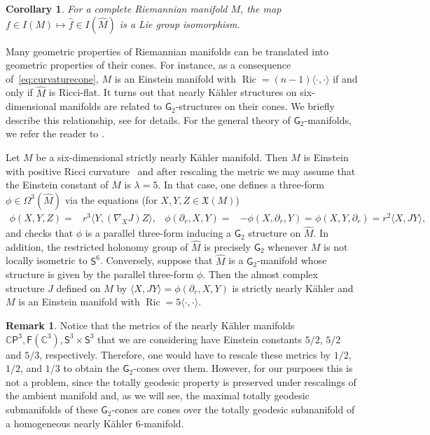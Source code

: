 \documentclass[11pt,a4paper,final]{amsart}
\newcommand{\s}{\mathsf}
\newcommand{\g}{\mathfrak}
\newcommand{\C}{\mathbb{C}}
\renewcommand{\hat}{\widehat}
\newtheorem{corollary}[theorem]{Corollary}
\theoremstyle{definition}
\newtheorem{remark}[theorem]{Remark}
\begin{document}
\begin{corollary}\label{cor:ConeIsometryGroup}
	For a complete Riemannian manifold $M$, the map $f\in I(M)\mapsto \hat{f}\in I(\hat{M})$ is a Lie group isomorphism.
\end{corollary}

Many geometric properties of Riemannian manifolds can be translated into geometric properties of their cones.
For instance, as a consequence of~\eqref{eq:curvaturecone}, $M$ is an Einstein manifold with $\operatorname{Ric}=(n-1)\langle\cdot,\cdot\rangle$ if and only if $\hat{M}$ is Ricci-flat.
It turns out that nearly Kähler structures on six-dimensional manifolds are related to $\s{G}_{2}$-structures on their cones.
We briefly describe this relationship, see \cite{bar} for details.
For the general theory of $\s{G}_{2}$-manifolds, we refer the reader to \cite[Chapter~10]{joyce}.

Let $M$ be a six-dimensional strictly nearly Kähler manifold.
Then $M$ is Einstein with positive Ricci curvature~\cite[Theorem~5.2]{GrayStructure} and after rescaling the metric we may assume that the Einstein constant of $M$ is $\lambda=5$.
In that case, one defines a three-form $\phi\in\Omega^{3}(\hat{M})$ via the equations (for $X,Y,Z\in \g{X}(M)$)
\[
	\begin{aligned}
		\phi(X,Y,Z)={}&r^{3}\langle Y,(\nabla_{X}J)Z \rangle, &
		\phi(\partial_{r},X,Y)=&-\phi(X,\partial_{r},Y)=\phi(X,Y,\partial_{r})=r^2 \langle X,JY\rangle,
	\end{aligned}
\] 
and checks that $\phi$ is a parallel three-form inducing a $\s{G}_{2}$ structure on $\hat{M}$.
In addition, the restricted holonomy group of $\hat{M}$ is precisely $\s{G}_{2}$ whenever $M$ is not locally isometric to $\s{S}^6$.
Conversely, suppose that $\hat{M}$ is a $\s{G}_{2}$-manifold whose structure is given by the parallel three-form $\phi$.
Then the almost complex structure $J$ defined on $M$ by
$
	\langle X,JY \rangle=\phi(\partial_{r},X,Y)
$
is strictly nearly Kähler and $M$ is an Einstein manifold with $\operatorname{Ric}=5\langle\cdot,\cdot\rangle$.
\begin{remark}
Notice that the metrics of the nearly Kähler manifolds $\C\s{P}^3, \s{F}(\C^3), \s{S}^3\times\s{S}^3$ that we are considering have Einstein constants $5/2$, $5/2$ and $5/3$, respectively. Therefore, one would have to rescale these metrics by $1/2$, $1/2$, and $1/3$ to obtain the $\s{G}_2$-cones over them. However, for our purposes this is not a problem, since the totally geodesic property is preserved under rescalings of the ambient manifold and, as we will see, the maximal totally geodesic submanifolds of these $\s{G}_2$-cones are cones over the totally geodesic submanifold of a homogeneous nearly Kähler $6$-manifold.
\end{remark}
\end{document}
